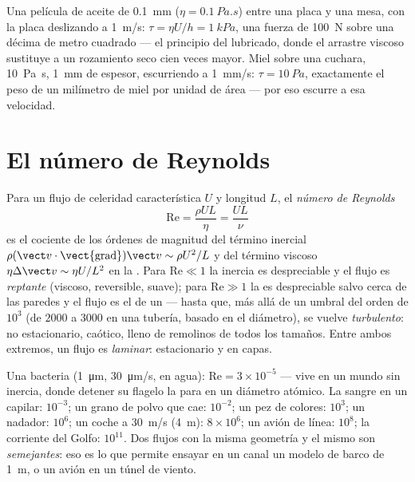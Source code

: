 \begin{example}\label{ex:b2:viscous-flows:table}
Una película de aceite de \qty{0.1}{mm} ($\eta = \qty{0.1}{Pa.s}$) entre una
placa y una mesa, con la placa deslizando a \qty{1}{m/s}: $\tau = \eta U/h = \qty{1}{kPa}$, una
fuerza de \qty{100}{N} sobre una décima de metro cuadrado --- el principio
del  lubricado, donde el arrastre viscoso sustituye a un
rozamiento seco cien veces mayor. Miel sobre una cuchara, \qty{10}{Pa.s}, \qty{1}{mm} de espesor,
escurriendo a \qty{1}{mm/s}: $\tau = \qty{10}{Pa}$, exactamente el peso de un
milímetro de miel por unidad de área --- por eso escurre a esa velocidad.
\end{example}

\section{El número de Reynolds}

\begin{definition}\label{def:b2:viscous-flows:reynolds}
Para un flujo de celeridad característica $U$ y longitud $L$, el
\emph{número de Reynolds}
\[
\mathrm{Re} = \frac{\rho UL}{\eta} = \frac{UL}{\nu}
\]
es el cociente de los órdenes de magnitud del término inercial
$\rho(\vect v\cdot\operatorname{\vect{grad}})\vect v \sim \rho U^2/L$ y del
término viscoso $\eta\Delta\vect v \sim \eta U/L^2$ en la . Para $\mathrm{Re} \ll 1$ la inercia es despreciable y el flujo es
\emph{reptante} (viscoso, reversible, suave); para $\mathrm{Re} \gg 1$
la  es despreciable salvo cerca de las paredes y el flujo es el
de un  --- hasta que, más allá de un umbral del orden de $10^3$ (de $2000$
a $3000$ en una tubería, basado en el diámetro), se vuelve \emph{turbulento}:
no estacionario, caótico, lleno de remolinos de todos los tamaños. Entre
ambos extremos, un flujo es \emph{laminar}: estacionario y en capas.
\end{definition}

\begin{example}\label{ex:b2:viscous-flows:revalues}
Una bacteria (\qty{1}{\micro m}, \qty{30}{\micro m/s}, en agua): $\mathrm{Re} =
3 \times 10^{-5}$ --- vive en un mundo sin inercia, donde detener su
flagelo la para en un diámetro atómico. La sangre en un capilar:
$10^{-3}$; un grano de polvo que cae: $10^{-2}$; un pez de colores: $10^3$; un nadador:
$10^6$; un coche a \qty{30}{m/s} (\qty{4}{m}): $8 \times 10^6$; un avión de línea: $10^8$;
la corriente del Golfo: $10^{11}$. Dos flujos con la misma geometría y el mismo
 son \emph{semejantes}: eso es lo que permite ensayar en
un canal un modelo de barco de \qty{1}{m}, o un avión en un túnel de viento.
\end{example}

